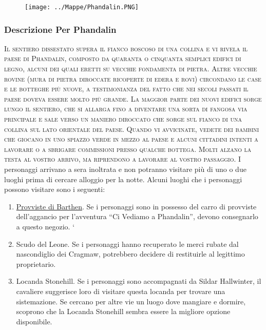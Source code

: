 \documentclass{article}
\begin{document}
       \begin{figure}[ht] 
        \texttt{[image: ../Mappe/Phandalin.PNG]}
        \end{figure}

        \subsubsection{Descrizione Per Phandalin}
        \textsc{Il sentiero dissestato supera il fianco boscoso di una collina
        e vi rivela il paese di Phandalin, composto da quaranta o
        cinquanta semplici edifici di legno, alcuni dei quali eretti su
        vecchie fondamenta di pietra. Altre vecchie rovine (mura di
        pietra diroccate ricoperte di edera e rovi) circondano le case e
        le botteghe più nuove, a testimonianza del fatto che nei secoli
        passati il paese doveva essere molto più grande. La maggior
        parte dei nuovi edifici sorge lungo il sentiero, che si allarga
        fino a diventare una sorta di fangosa via principale e sale verso
        un maniero diroccato che sorge sul fianco di una collina sul
        lato orientale del paese.
        Quando vi avvicinate, vedete dei bambini che giocano in
        uno spiazzo verde in mezzo al paese e alcuni cittadini intenti
        a lavorare o a sbrigare commissioni presso qualche bottega.
        Molti alzano la testa al vostro arrivo, ma riprendono a lavorare
        al vostro passaggio.} 
I personaggi
arrivano a sera inoltrata e non potranno visitare più di uno o 
due luoghi prima di cercare alloggio per la notte.\newline
Alcuni luoghi che i personaggi possono visitare sono
i seguenti:
\begin{enumerate}
    \item \hyperlink{provviste}{Provviste di Barthen}. Se i personaggi sono in possesso del
carro di provviste dell’aggancio per l'avventura “Ci Vediamo
a Phandalin”, devono consegnarlo a questo negozio.
`\item Scudo del Leone. Se i personaggi hanno recuperato le
merci rubate dal nascondiglio dei Cragmaw, potrebbero
decidere di restituirle al legittimo proprietario.
\item Locanda Stonehill. Se i personaggi sono accompagnati
da Sildar Hallwinter, il cavaliere suggerisce loro di visitare
questa locanda per trovare una sistemazione. Se cercano
per altre vie un luogo dove mangiare e dormire, scoprono
che la Locanda Stonehill sembra essere la migliore opzione
disponibile.
\end{enumerate}
\end{document}
